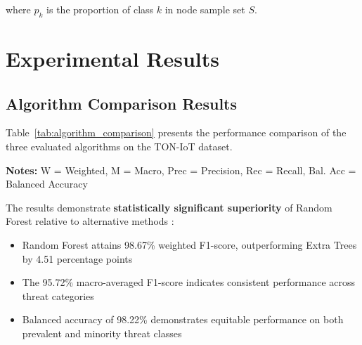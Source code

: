 \documentclass[conference]{IEEEtran}
\begin{document}
where $p_k$ is the proportion of class $k$ in node sample set $S$.

\section{Experimental Results}

\subsection{Algorithm Comparison Results}

Table~\ref{tab:algorithm_comparison} presents the performance comparison of the three evaluated algorithms on the TON-IoT dataset.



\begin{table}[h]
\centering
\caption{Algorithm Performance Comparison on TON-IoT Dataset}
\label{tab:algorithm_comparison}
\end{table}

\textbf{Notes:} W = Weighted, M = Macro, Prec = Precision, Rec = Recall, Bal. Acc = Balanced Accuracy

The results demonstrate \textbf{statistically significant superiority} of Random Forest relative to alternative methods \cite{b6, b21}:

\begin{itemize}
\item Random Forest attains 98.67\% weighted F1-score, outperforming Extra Trees by 4.51 percentage points \cite{b6}
\item The 95.72\% macro-averaged F1-score indicates consistent performance across threat categories \cite{b7}
\item Balanced accuracy of 98.22\% demonstrates equitable performance on both prevalent and minority threat classes \cite{b22}
\end{itemize}
\end{document}
